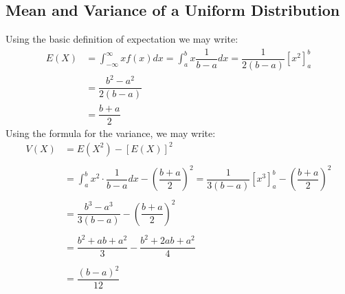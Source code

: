 \documentclass[10pt,a4paper]{article}
\begin{document}
\subsection*{Mean and Variance of a Uniform Distribution}
Using the basic definition of expectation we may write:
\begin{align*}
E(X)& = \int_{-\infty}^{\infty} xf(x)dx = \int_{a}^{b}x \dfrac{1}{b-a}dx=\dfrac{1}{2(b-a)}\left[x^2\right]^b_a\\
&= \dfrac{b^2-a^2}{2(b-a)}\\
&= \dfrac{b+a}{2}
\end{align*}
Using the formula for the variance, we may write:
\begin{align*}
V(X) &= E(X^2)-\left[E(X)\right]^2\\\\
&=\int_{a}^{b}x^2\cdot\dfrac{1}{b-a}dx-\left(\dfrac{b+a}{2}\right)^2=\dfrac{1}{3(b-a)}\left[x^3\right]^b_a-\left(\dfrac{b+a}{2}\right)^2\\\\
&=\dfrac{b^3-a^3}{3(b-a)}-\left(\dfrac{b+a}{2}\right)^2\\\\
&=\dfrac{b^2+ab+a^2}{3}-\dfrac{b^2+2ab+a^2}{4}\\\\
&=\dfrac{(b-a)^2}{12}
\end{align*}
\end{document}

